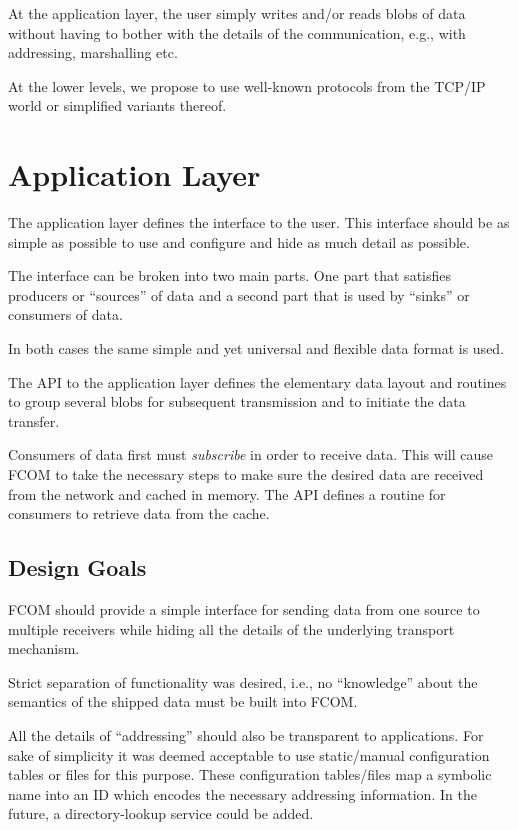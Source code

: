 \documentclass[11pt]{article}
\newcommand{\fcom}{FCOM}
\newcommand{\blob}{blob}
\begin{document}
At the application layer, the user simply writes and/or reads
\blob{}s of data without having to bother with the details
of the communication, e.g., with addressing, marshalling etc.

At the lower levels, we propose to use well-known protocols
from the TCP/IP world or simplified variants thereof.

\section{Application Layer}
The application layer defines the interface to the user.
This interface should be as simple as possible to use and
configure and hide as much detail as possible.

The interface can be broken into two main parts. One part 
that satisfies producers or ``sources'' of data and a
second part that is used by ``sinks'' or consumers of
data.

In both cases the same simple and yet universal and flexible
data format is used.

The API to the application layer defines the elementary
data layout and routines to group several \blob{}s for
subsequent transmission and to initiate the data transfer.

Consumers of data first must {\em subscribe} in order
to receive data. This will cause \fcom{} to take the
necessary steps to make sure the desired data are
received from the network and cached in memory. 
The API defines a routine for consumers to retrieve
data from the cache.

  \subsection{Design Goals}
    \fcom{} should provide a simple interface for sending
    data from one source to multiple receivers while hiding
    all the details of the underlying transport mechanism.	

    Strict separation of functionality was desired, i.e.,
    no ``knowledge'' about the semantics of the shipped
    data must be built into \fcom.

    All the details of ``addressing'' should also be
    transparent to applications. For sake of simplicity
    it was deemed acceptable to use static/manual 
    configuration tables or files for this purpose.
    These configuration tables/files map a symbolic
    name into an ID which encodes the necessary 
    addressing information. In the future, a directory-lookup
    service could be added.
\end{document}
